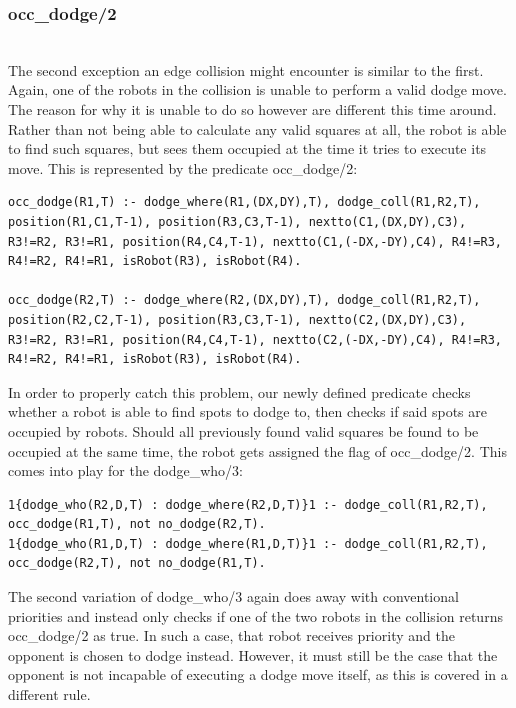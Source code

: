 \documentclass{llncs}
\begin{document}
\subsubsection{occ\_dodge/2}\hfill\\
The second exception an edge collision might encounter is similar to the first. Again, one of the robots in the collision is unable to perform a valid dodge move. The reason for why it is unable to do so however are different this time around. Rather than not being able to calculate any valid squares at all, the robot is able to find such squares, but sees them occupied at the time it tries to execute its move. This is represented by the predicate occ\_dodge/2:

\begin{lstlisting}[basicstyle=\fontsize{9}{11}\selectfont\ttfamily,frame=single,breaklines=true]
occ_dodge(R1,T) :- dodge_where(R1,(DX,DY),T), dodge_coll(R1,R2,T), position(R1,C1,T-1), position(R3,C3,T-1), nextto(C1,(DX,DY),C3), R3!=R2, R3!=R1, position(R4,C4,T-1), nextto(C1,(-DX,-DY),C4), R4!=R3, R4!=R2, R4!=R1, isRobot(R3), isRobot(R4).

occ_dodge(R2,T) :- dodge_where(R2,(DX,DY),T), dodge_coll(R1,R2,T), position(R2,C2,T-1), position(R3,C3,T-1), nextto(C2,(DX,DY),C3), R3!=R2, R3!=R1, position(R4,C4,T-1), nextto(C2,(-DX,-DY),C4), R4!=R3, R4!=R2, R4!=R1, isRobot(R3), isRobot(R4).
\end{lstlisting}
In order to properly catch this problem, our newly defined predicate checks whether a robot is able to find spots to dodge to, then checks if said spots are occupied by robots. Should all previously found valid squares be found to be occupied at the same time, the robot gets assigned the flag of occ\_dodge/2.\newline
This comes into play for the dodge\_who/3:
\begin{lstlisting}[basicstyle=\fontsize{9}{11}\selectfont\ttfamily,frame=single,breaklines=true]
1{dodge_who(R2,D,T) : dodge_where(R2,D,T)}1 :- dodge_coll(R1,R2,T), occ_dodge(R1,T), not no_dodge(R2,T).
1{dodge_who(R1,D,T) : dodge_where(R1,D,T)}1 :- dodge_coll(R1,R2,T), occ_dodge(R2,T), not no_dodge(R1,T).
\end{lstlisting}
The second variation of dodge\_who/3 again does away with conventional priorities and instead only checks if one of the two robots in the collision returns occ\_dodge/2 as true. In such a case, that robot receives priority and the opponent is chosen to dodge instead. However, it must still be the case that the opponent is not incapable of executing a dodge move itself, as this is covered in a different rule.\newline\newline
\end{document}
